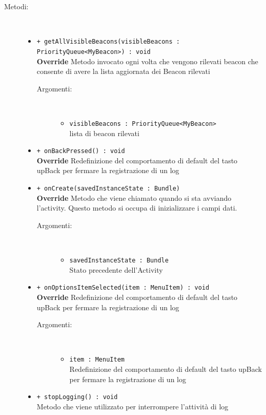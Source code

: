 \documentclass[../DefinizioneDiProdotto.tex]{subfiles}
\begin{document}
\begin{description}
\begin{itemize}
	\end{itemize}
	\item[Metodi:] \
	\begin{itemize}
		\item \texttt{+ getAllVisibleBeacons(visibleBeacons : PriorityQueue<MyBeacon>) : void}\\
		\textbf{Override} Metodo invocato ogni volta che vengono rilevati beacon che consente di avere la lista aggiornata dei Beacon rilevati
		\begin{description}
			\item[Argomenti:] \
			\begin{itemize}
				\item \texttt{visibleBeacons : PriorityQueue<MyBeacon>}\\
				lista di beacon rilevati\end{itemize}
		\end{description}
		\item \texttt{+ onBackPressed() : void}\\
		\textbf{Override} Redefinizione del comportamento di default del tasto upBack per fermare la registrazione di un log
		\item \texttt{+ onCreate(savedInstanceState : Bundle)}\\
		\textbf{Override} Metodo che viene chiamato quando si sta avviando l'activity. Questo metodo si occupa di inizializzare i campi dati.
		\begin{description}
			\item[Argomenti:] \
			\begin{itemize}
				\item \texttt{savedInstanceState : Bundle}\\
				Stato precedente dell'Activity\end{itemize}
		\end{description}
		\item \texttt{+ onOptionsItemSelected(item : MenuItem) : void}\\
		\textbf{Override} Redefinizione del comportamento di default del tasto upBack per fermare la registrazione di un log
		\begin{description}
			\item[Argomenti:] \
			\begin{itemize}
				\item \texttt{item : MenuItem}\\
				Redefinizione del comportamento di default del tasto upBack per fermare la registrazione di un log\end{itemize}
		\end{description}
		\item \texttt{+ stopLogging() : void}\\
		Metodo che viene utilizzato per interrompere l'attività di log
	\end{itemize}
\end{description}
\end{document}
